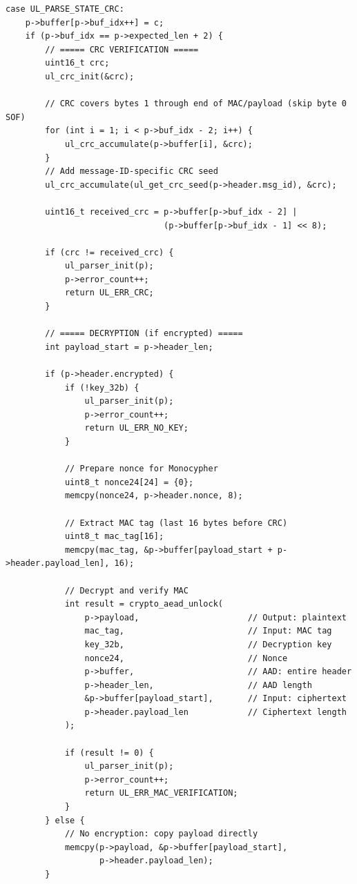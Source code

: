 \documentclass[11pt,a4paper]{article}
\begin{document}
\begin{lstlisting}[caption={CRC State Implementation (Comprehensive)}]
case UL_PARSE_STATE_CRC:
    p->buffer[p->buf_idx++] = c;
    if (p->buf_idx == p->expected_len + 2) {
        // ===== CRC VERIFICATION =====
        uint16_t crc;
        ul_crc_init(&crc);
        
        // CRC covers bytes 1 through end of MAC/payload (skip byte 0 SOF)
        for (int i = 1; i < p->buf_idx - 2; i++) {
            ul_crc_accumulate(p->buffer[i], &crc);
        }
        // Add message-ID-specific CRC seed
        ul_crc_accumulate(ul_get_crc_seed(p->header.msg_id), &crc);

        uint16_t received_crc = p->buffer[p->buf_idx - 2] | 
                                (p->buffer[p->buf_idx - 1] << 8);
        
        if (crc != received_crc) {
            ul_parser_init(p);
            p->error_count++;
            return UL_ERR_CRC;
        }

        // ===== DECRYPTION (if encrypted) =====
        int payload_start = p->header_len;
        
        if (p->header.encrypted) {
            if (!key_32b) {
                ul_parser_init(p);
                p->error_count++;
                return UL_ERR_NO_KEY;
            }

            // Prepare nonce for Monocypher
            uint8_t nonce24[24] = {0};
            memcpy(nonce24, p->header.nonce, 8);

            // Extract MAC tag (last 16 bytes before CRC)
            uint8_t mac_tag[16];
            memcpy(mac_tag, &p->buffer[payload_start + p->header.payload_len], 16);

            // Decrypt and verify MAC
            int result = crypto_aead_unlock(
                p->payload,                      // Output: plaintext
                mac_tag,                         // Input: MAC tag
                key_32b,                         // Decryption key
                nonce24,                         // Nonce
                p->buffer,                       // AAD: entire header
                p->header_len,                   // AAD length
                &p->buffer[payload_start],       // Input: ciphertext
                p->header.payload_len            // Ciphertext length
            );

            if (result != 0) {
                ul_parser_init(p);
                p->error_count++;
                return UL_ERR_MAC_VERIFICATION;
            }
        } else {
            // No encryption: copy payload directly
            memcpy(p->payload, &p->buffer[payload_start], 
                   p->header.payload_len);
        }


\end{lstlisting}
\end{document}
